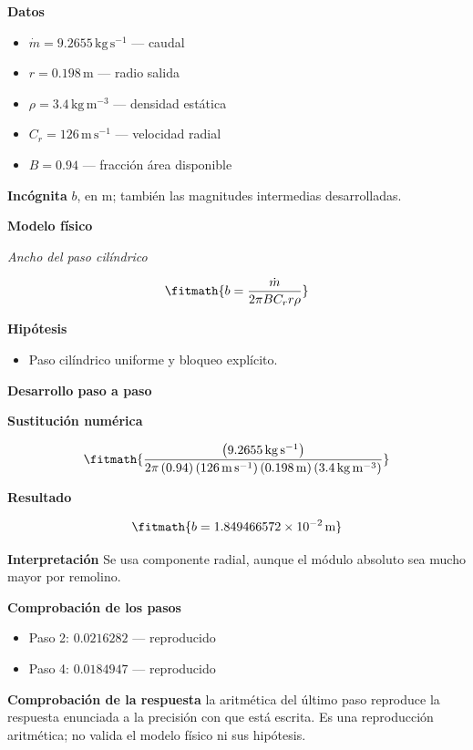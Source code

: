\documentclass[10pt,openany]{book}
\begin{document}
\noindent\textbf{Datos}
\begin{itemize}
\item $\dot m = 9.2655\,\mathrm{kg}\,\mathrm{s}^{-1}$ — caudal
\item $r = 0.198\,\mathrm{m}$ — radio salida
\item $\rho = 3.4\,\mathrm{kg}\,\mathrm{m}^{-3}$ — densidad estática
\item $C_r = 126\,\mathrm{m}\,\mathrm{s}^{-1}$ — velocidad radial
\item $B = 0.94$ — fracción área disponible
\end{itemize}

\noindent\textbf{Incógnita}
$b$, en $\mathrm{m}$; también las magnitudes intermedias desarrolladas.

\noindent\textbf{Modelo físico}

\noindent\textit{Ancho del paso cilíndrico}

\[
\fitmath{b=\frac{\dot m}{2 \pi B C_r r \rho}}
\]

\noindent\textbf{Hipótesis}
\begin{itemize}
\item Paso cilíndrico uniforme y bloqueo explícito.
\end{itemize}

\noindent\textbf{Desarrollo paso a paso}



\noindent\textbf{Sustitución numérica}

\[
\fitmath{\frac{\left(9.2655\,\mathrm{kg}\,\mathrm{s}^{-1}\right)}{2 \pi \left(0.94\right) \left(126\,\mathrm{m}\,\mathrm{s}^{-1}\right) \left(0.198\,\mathrm{m}\right) \left(3.4\,\mathrm{kg}\,\mathrm{m}^{-3}\right)}}
\]

\noindent\textbf{Resultado}

\[
\fitmath{b=1.849466572\times10^{-2}\,\mathrm{m}}
\]

\noindent\textbf{Interpretación}
Se usa componente radial, aunque el módulo absoluto sea mucho mayor por remolino.

\noindent\textbf{Comprobación de los pasos}
\begin{itemize}
\item Paso 2: $0.0216282$ — reproducido
\item Paso 4: $0.0184947$ — reproducido
\end{itemize}

\noindent\textbf{Comprobación de la respuesta} la aritmética del último paso reproduce la respuesta enunciada a la precisión con que está escrita. Es una reproducción aritmética; no valida el modelo físico ni sus hipótesis.
\end{document}
